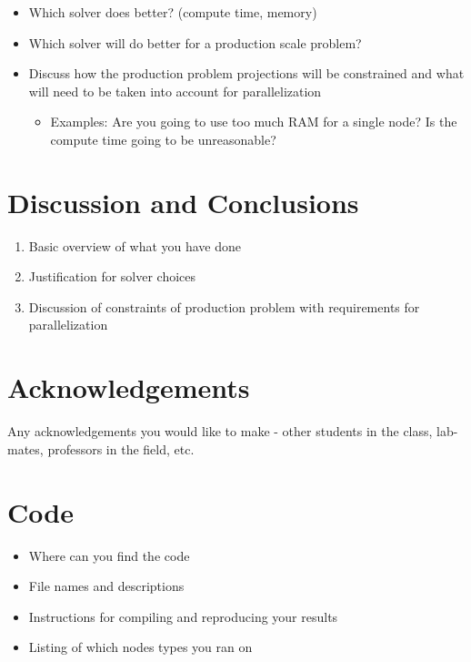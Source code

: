 \documentclass{article}
\begin{document}
\begin{spacing}{1.1}
\begin{itemize}
    \item Which solver does better? (compute time, memory)
    \item Which solver will do better for a production scale problem?
    \item Discuss how the production problem projections will be constrained and what will need to be taken into account for parallelization
    \begin{itemize}
        \item Examples: Are you going to use too much RAM for a single node? Is the compute time going to be unreasonable?
    \end{itemize}
\end{itemize}

\section{Discussion and Conclusions}

\begin{enumerate}
    \item Basic overview of what you have done
    \item Justification for solver choices 
    \item Discussion of constraints of production problem with requirements for parallelization
\end{enumerate}






\newpage
\begin{appendices}

\section{Acknowledgements}

Any acknowledgements you would like to make - other students in the class, lab-mates, professors in the field, etc.

\section{Code}

\begin{itemize}
    \item Where can you find the code
    \item File names and descriptions
    \item Instructions for compiling and reproducing your results
    \item Listing of which nodes types you ran on 
\end{itemize}


\end{appendices}
\end{spacing}
\end{document}
